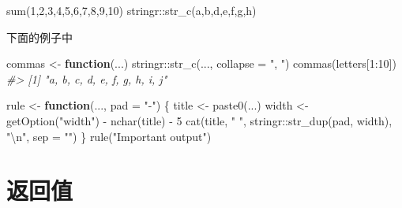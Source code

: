 \documentclass[
]{book}
\newenvironment{Shaded}{\begin{snugshade}}{\end{snugshade}}
\newcommand{\AttributeTok}[1]{\textcolor[rgb]{0.77,0.63,0.00}{#1}}
\newcommand{\CommentTok}[1]{\textcolor[rgb]{0.56,0.35,0.01}{\textit{#1}}}
\newcommand{\ControlFlowTok}[1]{\textcolor[rgb]{0.13,0.29,0.53}{\textbf{#1}}}
\newcommand{\DecValTok}[1]{\textcolor[rgb]{0.00,0.00,0.81}{#1}}
\newcommand{\FunctionTok}[1]{\textcolor[rgb]{0.00,0.00,0.00}{#1}}
\newcommand{\NormalTok}[1]{#1}
\newcommand{\OtherTok}[1]{\textcolor[rgb]{0.56,0.35,0.01}{#1}}
\newcommand{\SpecialCharTok}[1]{\textcolor[rgb]{0.00,0.00,0.00}{#1}}
\newcommand{\StringTok}[1]{\textcolor[rgb]{0.31,0.60,0.02}{#1}}
\begin{document}
\begin{Shaded}
\begin{Highlighting}[]
\FunctionTok{sum}\NormalTok{(}\DecValTok{1}\NormalTok{,}\DecValTok{2}\NormalTok{,}\DecValTok{3}\NormalTok{,}\DecValTok{4}\NormalTok{,}\DecValTok{5}\NormalTok{,}\DecValTok{6}\NormalTok{,}\DecValTok{7}\NormalTok{,}\DecValTok{8}\NormalTok{,}\DecValTok{9}\NormalTok{,}\DecValTok{10}\NormalTok{)}
\NormalTok{stringr}\SpecialCharTok{::}\FunctionTok{str\_c}\NormalTok{(}\StringTok{\textquotesingle{}a\textquotesingle{}}\NormalTok{,}\StringTok{\textquotesingle{}b\textquotesingle{}}\NormalTok{,}\StringTok{\textquotesingle{}d\textquotesingle{}}\NormalTok{,}\StringTok{\textquotesingle{}e\textquotesingle{}}\NormalTok{,}\StringTok{\textquotesingle{}f\textquotesingle{}}\NormalTok{,}\StringTok{\textquotesingle{}g\textquotesingle{}}\NormalTok{,}\StringTok{\textquotesingle{}h\textquotesingle{}}\NormalTok{)}
\end{Highlighting}
\end{Shaded}

下面的例子中

\begin{Shaded}
\begin{Highlighting}[]
\NormalTok{commas }\OtherTok{\textless{}{-}} \ControlFlowTok{function}\NormalTok{(...) stringr}\SpecialCharTok{::}\FunctionTok{str\_c}\NormalTok{(..., }\AttributeTok{collapse =} \StringTok{", "}\NormalTok{)}
\FunctionTok{commas}\NormalTok{(letters[}\DecValTok{1}\SpecialCharTok{:}\DecValTok{10}\NormalTok{])}
\CommentTok{\#\textgreater{} [1] "a, b, c, d, e, f, g, h, i, j"}

\NormalTok{rule }\OtherTok{\textless{}{-}} \ControlFlowTok{function}\NormalTok{(..., }\AttributeTok{pad =} \StringTok{"{-}"}\NormalTok{) \{}
\NormalTok{  title }\OtherTok{\textless{}{-}} \FunctionTok{paste0}\NormalTok{(...)}
\NormalTok{  width }\OtherTok{\textless{}{-}} \FunctionTok{getOption}\NormalTok{(}\StringTok{"width"}\NormalTok{) }\SpecialCharTok{{-}} \FunctionTok{nchar}\NormalTok{(title) }\SpecialCharTok{{-}} \DecValTok{5}
  \FunctionTok{cat}\NormalTok{(title, }\StringTok{" "}\NormalTok{, stringr}\SpecialCharTok{::}\FunctionTok{str\_dup}\NormalTok{(pad, width), }\StringTok{"}\SpecialCharTok{\textbackslash{}n}\StringTok{"}\NormalTok{, }\AttributeTok{sep =} \StringTok{""}\NormalTok{)}
\NormalTok{\}}
\FunctionTok{rule}\NormalTok{(}\StringTok{"Important output"}\NormalTok{)}
\end{Highlighting}
\end{Shaded}

\hypertarget{ux8fd4ux56deux503c}{%
\section{返回值}\label{ux8fd4ux56deux503c}}
\end{document}
